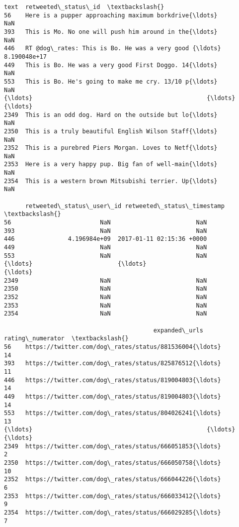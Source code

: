 \documentclass[11pt]{article}
\begin{document}
\begin{tcolorbox}[breakable, size=fbox, boxrule=.5pt, pad at break*=1mm, opacityfill=0]
\begin{Verbatim}[commandchars=\\\{\}]
                                                   text  retweeted\_status\_id  \textbackslash{}
56    Here is a pupper approaching maximum borkdrive{\ldots}                  NaN
393   This is Mo. No one will push him around in the{\ldots}                  NaN
446   RT @dog\_rates: This is Bo. He was a very good {\ldots}         8.190048e+17
449   This is Bo. He was a very good First Doggo. 14{\ldots}                  NaN
553   This is Bo. He's going to make me cry. 13/10 p{\ldots}                  NaN
{\ldots}                                                 {\ldots}                  {\ldots}
2349  This is an odd dog. Hard on the outside but lo{\ldots}                  NaN
2350  This is a truly beautiful English Wilson Staff{\ldots}                  NaN
2352  This is a purebred Piers Morgan. Loves to Netf{\ldots}                  NaN
2353  Here is a very happy pup. Big fan of well-main{\ldots}                  NaN
2354  This is a western brown Mitsubishi terrier. Up{\ldots}                  NaN

      retweeted\_status\_user\_id retweeted\_status\_timestamp  \textbackslash{}
56                         NaN                        NaN
393                        NaN                        NaN
446               4.196984e+09  2017-01-11 02:15:36 +0000
449                        NaN                        NaN
553                        NaN                        NaN
{\ldots}                        {\ldots}                        {\ldots}
2349                       NaN                        NaN
2350                       NaN                        NaN
2352                       NaN                        NaN
2353                       NaN                        NaN
2354                       NaN                        NaN

                                          expanded\_urls  rating\_numerator  \textbackslash{}
56    https://twitter.com/dog\_rates/status/881536004{\ldots}                14
393   https://twitter.com/dog\_rates/status/825876512{\ldots}                11
446   https://twitter.com/dog\_rates/status/819004803{\ldots}                14
449   https://twitter.com/dog\_rates/status/819004803{\ldots}                14
553   https://twitter.com/dog\_rates/status/804026241{\ldots}                13
{\ldots}                                                 {\ldots}               {\ldots}
2349  https://twitter.com/dog\_rates/status/666051853{\ldots}                 2
2350  https://twitter.com/dog\_rates/status/666050758{\ldots}                10
2352  https://twitter.com/dog\_rates/status/666044226{\ldots}                 6
2353  https://twitter.com/dog\_rates/status/666033412{\ldots}                 9
2354  https://twitter.com/dog\_rates/status/666029285{\ldots}                 7


\end{Verbatim}
\end{tcolorbox}
\end{document}
